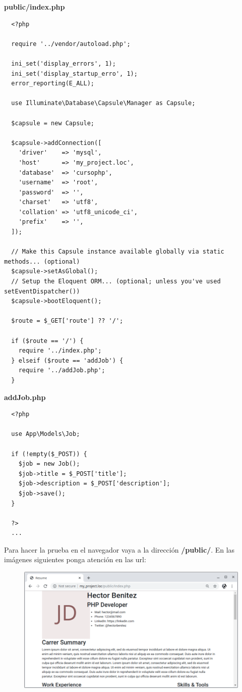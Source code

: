 \documentclass{article}
\begin{document}
\textbf{public/index.php}
\begin{verbatim}
  <?php

  require '../vendor/autoload.php';

  ini_set('display_errors', 1);
  ini_set('display_startup_erro', 1);
  error_reporting(E_ALL);

  use Illuminate\Database\Capsule\Manager as Capsule;

  $capsule = new Capsule;

  $capsule->addConnection([
    'driver'    => 'mysql',
    'host'      => 'my_project.loc',
    'database'  => 'cursophp',
    'username'  => 'root',
    'password'  => '',
    'charset'   => 'utf8',
    'collation' => 'utf8_unicode_ci',
    'prefix'    => '',
  ]);

  // Make this Capsule instance available globally via static methods... (optional)
  $capsule->setAsGlobal();
  // Setup the Eloquent ORM... (optional; unless you've used setEventDispatcher())
  $capsule->bootEloquent();

  $route = $_GET['route'] ?? '/';

  if ($route == '/') {
    require '../index.php';
  } elseif ($route == 'addJob') {
    require '../addJob.php';
  }
\end{verbatim}

\textbf{addJob.php}
\begin{verbatim}
  <?php

  use App\Models\Job;

  if (!empty($_POST)) {
    $job = new Job();
    $job->title = $_POST['title'];
    $job->description = $_POST['description'];
    $job->save();
  }

  ?>
  ...
\end{verbatim}

Para hacer la prueba en el navegador vaya a la dirección \textbf{/public/}. En
las imágenes siguientes ponga atención en las url:\\

\begin{figure}[h!]
  \centering
  \includegraphics[scale=0.5]{./Pictures/109_front_controller.png}
\end{figure}
\end{document}
